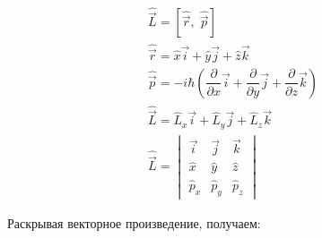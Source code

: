 \documentclass[a4paper,14pt]{article}
\begin{document}
\begin{gather*}
	\hat{\vec L} = [\hat{\vec r}, \; \hat{\vec p}] \\
	\hat{\vec r} = \hat x \vec i + \hat y \vec j + \hat z \vec k \\
	\hat{\vec p} = -i\hbar \left(\dfrac{\partial}{\partial x} \vec i + \dfrac{\partial}{\partial y} \vec j + \dfrac{\partial}{\partial z} \vec k\right) \\
	\hat{\vec L} = \hat L_x \vec i + \hat L_y \vec j + \hat L_z \vec k \\
	\hat{\vec L} =
	\begin{vmatrix}
	\vec i & \vec j & \vec k \\
	\hat x & \hat y & \hat z \\
	\hat p_x & \hat p_y & \hat p_z
	\end{vmatrix}
\end{gather*}

Раскрывая векторное произведение, получаем:
\end{document}
